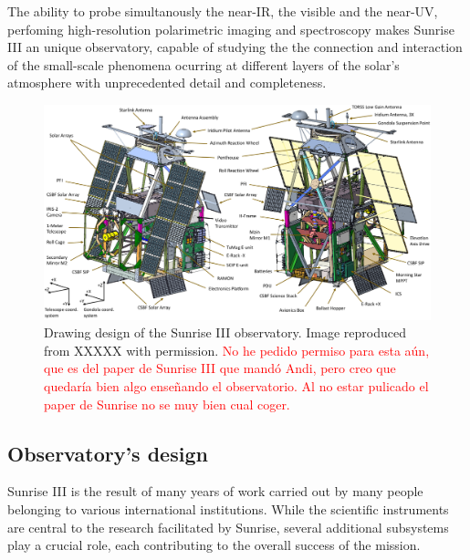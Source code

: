 The ability to probe simultanously the near-IR, the visible and the near-UV, perfoming high-resolution polarimetric imaging and spectroscopy makes Sunrise III an unique observatory, capable of studying the the connection  and interaction of the small-scale phenomena ocurring at different layers of the solar's atmosphere with unprecedented detail and completeness. 

\begin{figure}
    \includegraphics[width=\textwidth]{figures/TuMag/Sunrise_schematic.png}
    \caption{
      Drawing design of the Sunrise III observatory. Image reproduced from XXXXX with permission. \textcolor{red}{No he pedido permiso para esta aún, que es del paper de Sunrise III que mandó Andi, pero creo que quedaría bien algo enseñando el observatorio. Al no estar pulicado el paper de Sunrise no se muy bien cual coger.}}
      \label{fig: SunriseIII}
\end{figure}

\subsection{Observatory's design}

Sunrise III is the result of many years of work carried out by many people belonging to various international institutions.  While the scientific instruments are central to the research facilitated by Sunrise, several additional subsystems play a crucial role, each contributing to the overall success of the mission.

